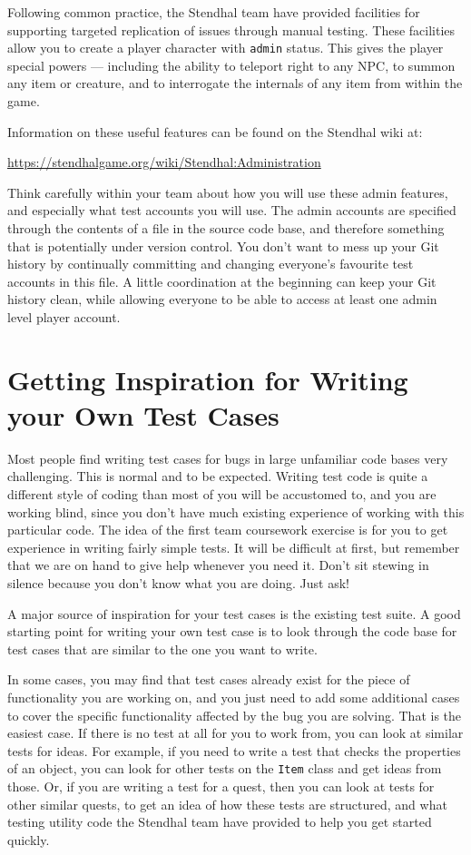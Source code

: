 \documentclass[
]{book}
\begin{document}
Following common practice, the Stendhal team have provided facilities for supporting targeted replication of issues through manual testing. These facilities allow you to create a player character with \texttt{admin} status. This gives the player special powers --- including the ability to teleport right to any NPC, to summon any item or creature, and to interrogate the internals of any item from within the game.

Information on these useful features can be found on the Stendhal wiki at:

\url{https://stendhalgame.org/wiki/Stendhal:Administration}

Think carefully within your team about how you will use these admin features, and especially what test accounts you will use. The admin accounts are specified through the contents of a file in the source code base, and therefore something that is potentially under version control. You don't want to mess up your Git history by continually committing and changing everyone's favourite test accounts in this file. A little coordination at the beginning can keep your Git history clean, while allowing everyone to be able to access at least one admin level player account.

\hypertarget{inspiration}{%
\section{Getting Inspiration for Writing your Own Test Cases}\label{inspiration}}

Most people find writing test cases for bugs in large unfamiliar code bases very challenging. This is normal and to be expected. Writing test code is quite a different style of coding than most of you will be accustomed to, and you are working blind, since you don't have much existing experience of working with this particular code. The idea of the first team coursework exercise is for you to get experience in writing fairly simple tests. It will be difficult at first, but remember that we are on hand to give help whenever you need it. Don't sit stewing in silence because you don't know what you are doing. Just ask!

A major source of inspiration for your test cases is the existing test suite. A good starting point for writing your own test case is to look through the code base for test cases that are similar to the one you want to write.

In some cases, you may find that test cases already exist for the piece of functionality you are working on, and you just need to add some additional cases to cover the specific functionality affected by the bug you are solving. That is the easiest case. If there is no test at all for you to work from, you can look at similar tests for ideas. For example, if you need to write a test that checks the properties of an object, you can look for other tests on the \texttt{Item} class and get ideas from those. Or, if you are writing a test for a quest, then you can look at tests for other similar quests, to get an idea of how these tests are structured, and what testing utility code the Stendhal team have provided to help you get started quickly.
\end{document}
